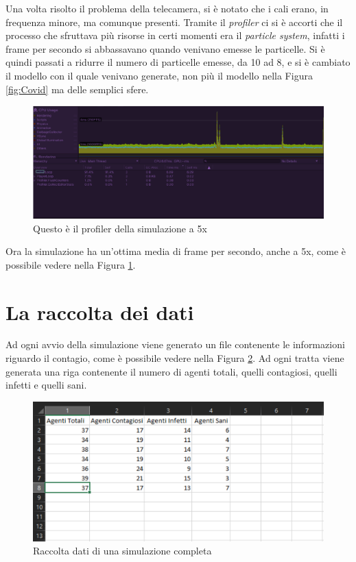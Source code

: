 \documentclass[12pt, openany]{book}
\begin{document}
 	Una volta risolto il problema della telecamera, si è notato che i cali erano, in frequenza minore, ma comunque presenti. Tramite il \emph{profiler} ci si è accorti che il processo che sfruttava più risorse in certi momenti era il \emph{particle system}, infatti i frame per secondo si abbassavano quando venivano emesse le particelle. Si è quindi passati a ridurre il numero di particelle emesse, da 10 ad 8, e si è cambiato il modello con il quale venivano generate, non più il modello nella Figura \ref{fig:Covid} ma delle semplici sfere.
 	\begin{figure}[H]
 		\centering
 		\includegraphics[width=1\linewidth]{"Immagini/ProfilerBuoniFPS.png"}
 		\caption{Questo è il profiler della simulazione a 5x}
 		\label{fig:ProfilerBuoniFPS}
 	\end{figure} 
 	Ora la simulazione ha un'ottima media di frame per secondo, anche a 5x, come è possibile vedere nella Figura \ref{fig:ProfilerBuoniFPS}.
 	\section{La raccolta dei dati}
 	Ad ogni avvio della simulazione viene generato un file contenente le informazioni riguardo il contagio, come è possibile vedere nella Figura \ref{fig:csv}. Ad ogni tratta viene generata una riga contenente il numero di agenti totali, quelli contagiosi, quelli infetti e quelli sani.
 	\begin{figure}[H]
 		\centering
 		\includegraphics[width=1\linewidth]{"Immagini/csv.png"}
 		\caption{Raccolta dati di una simulazione completa}
 		\label{fig:csv}
 	\end{figure}
	
	
\end{document}
